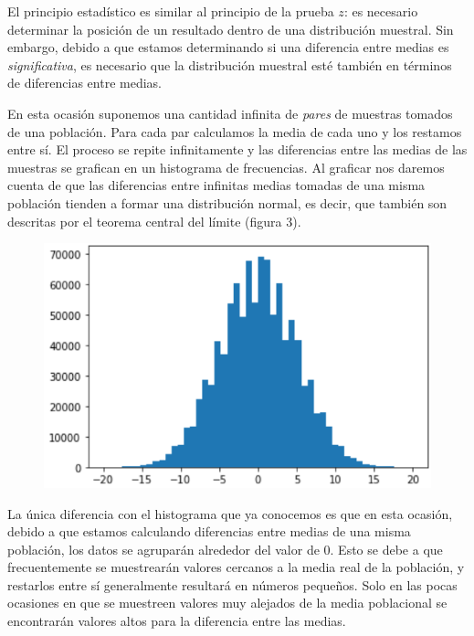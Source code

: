 \documentclass[a4paper,12pt]{article}
\begin{document}
El principio estadístico es similar al principio de la prueba $z$: es necesario determinar la posición de un resultado dentro de una distribución muestral. Sin embargo, debido a que estamos determinando si una diferencia entre medias es {\slshape significativa}, es necesario que la distribución muestral esté también en términos de diferencias entre medias.

En esta ocasión suponemos una cantidad infinita de {\slshape pares} de muestras tomados de una población. Para cada par calculamos la media de cada uno y los restamos entre sí. El proceso se repite infinitamente y las diferencias entre las medias de las muestras se grafican en un histograma de frecuencias. Al graficar nos daremos cuenta de que las diferencias entre infinitas medias tomadas de una misma población tienden a formar una distribución normal, es decir, que también son descritas por el teorema central del límite (figura 3).

\begin{figure}[!ht]
  \begin{center}
    \includegraphics[scale=0.5]{diferenciaMedias.png}
  \end{center}
\end{figure}

La única diferencia con el histograma que ya conocemos es que en esta ocasión, debido a que estamos calculando diferencias entre medias de una misma población, los datos se agruparán alrededor del valor de 0. Esto se debe a que frecuentemente se muestrearán valores cercanos a la media real de la población, y restarlos entre sí generalmente resultará en números pequeños. Solo en las pocas ocasiones en que se muestreen valores muy alejados de la media poblacional se encontrarán valores altos para la diferencia entre las medias.
\end{document}
